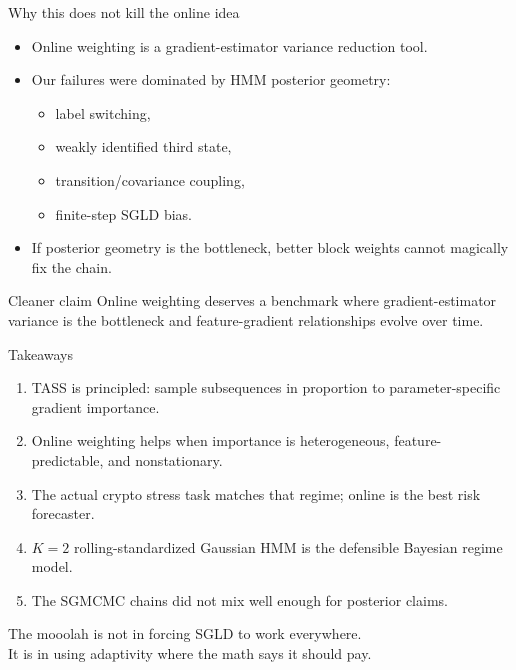\documentclass[aspectratio=169]{beamer}
\begin{document}
\begin{frame}{Why this does not kill the online idea}
  \begin{itemize}
    \item Online weighting is a gradient-estimator variance reduction tool.
    \item Our failures were dominated by HMM posterior geometry:
    \begin{itemize}
      \item label switching,
      \item weakly identified third state,
      \item transition/covariance coupling,
      \item finite-step SGLD bias.
    \end{itemize}
    \item If posterior geometry is the bottleneck, better block weights cannot magically fix the chain.
  \end{itemize}

  \begin{block}{Cleaner claim}
    Online weighting deserves a benchmark where gradient-estimator variance is the bottleneck and feature-gradient relationships evolve over time.
  \end{block}
\end{frame}

\begin{frame}{Takeaways}
  \begin{enumerate}
    \item TASS is principled: sample subsequences in proportion to parameter-specific gradient importance.
    \item Online weighting helps when importance is heterogeneous, feature-predictable, and nonstationary.
    \item The actual crypto stress task matches that regime; online is the best risk forecaster.
    \item $K=2$ rolling-standardized Gaussian HMM is the defensible Bayesian regime model.
    \item The SGMCMC chains did not mix well enough for posterior claims.
  \end{enumerate}

  \vspace{0.8em}
  \centering
  \Large
  The mooolah is not in forcing SGLD to work everywhere.\\
  It is in using adaptivity where the math says it should pay.
\end{frame}
\end{document}
